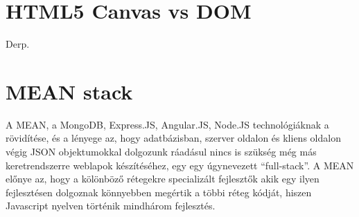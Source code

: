 \section{HTML5 Canvas vs DOM}
Derp.
















\section{MEAN stack}


A MEAN, a MongoDB, Express.JS, Angular.JS, Node.JS technológiáknak a rövidítése, és a lényege az, hogy adatbázisban, szerver oldalon és kliens oldalon végig JSON objektumokkal dolgozunk ráadásul nincs is szükség még más keretrendszerre weblapok készítéséhez, egy egy úgynevezett ``full-stack''. A MEAN előnye az, hogy a kölönböző rétegekre specializált fejlesztők akik egy ilyen fejlesztésen dolgoznak könnyebben megértik a többi réteg kódját, hiszen Javascript nyelven történik mindhárom fejlesztés. 



